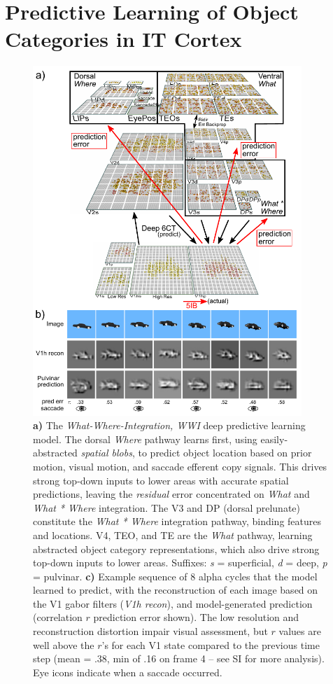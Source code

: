 \documentclass[11pt,twoside]{article}
\newif\myifpdf
\begin{document}
\section{Predictive Learning of Object Categories in IT Cortex}

\begin{figure}
  \centering\includegraphics[width=4in]{fig_03} %
  \caption{{\bf a)} The \emph{What-Where-Integration, WWI} deep predictive learning model. The dorsal \emph{Where} pathway learns first, using easily-abstracted \emph{spatial blobs}, to predict object location based on prior motion, visual motion, and saccade efferent copy signals.  This drives strong top-down inputs to lower areas with accurate spatial predictions, leaving the \emph{residual} error concentrated on \emph{What} and \emph{What * Where} integration.  The V3 and DP (dorsal prelunate) constitute the \emph{What * Where} integration pathway, binding features and locations.  V4, TEO, and TE are the \emph{What} pathway, learning abstracted object category representations, which also drive strong top-down inputs to lower areas.  Suffixes: \emph{s} = superficial, \emph{d} = deep, \emph{p} = pulvinar. {\bf c)} Example sequence of 8 alpha cycles that the model learned to predict, with the reconstruction of each image based on the V1 gabor filters (\emph{V1h recon}), and model-generated prediction (correlation $r$ prediction error shown).  The low resolution and reconstruction distortion impair visual assessment, but $r$ values are well above the $r$'s for each V1 state compared to the previous time step (mean = .38, min of .16 on frame 4 -- see SI for more analysis).  Eye icons indicate when a saccade occurred.}
  \label{fig.model}
\end{figure}
\end{document}
